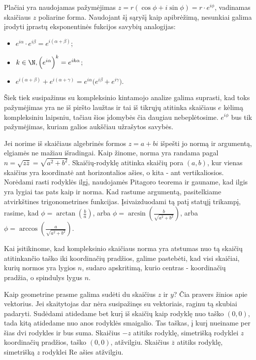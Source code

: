 Plačiai yra naudojamas pažymėjimas $z=r(\cos\phi+i\sin\phi)=r \cdot e^{i\phi}$, vadinamas skaičiaus $z$ poliarine forma. Naudojant šį sąryšį kaip apibrėžimą, nesunkiai galima įrodyti įprastų eksponentinės fukcijos savybių analogijas: \begin{itemize} 
\item $e^{i\alpha}\cdot e^{i\beta}=e^{i(\alpha+\beta)}$;
\item $k\in\N, \Big(e^{i\alpha}\Big)^k=e^{ik\alpha}$;
\item $e^{i(\alpha+\beta)}+e^{i(\alpha+\gamma)}=e^{i\alpha}\big(e^{i\beta}+e^{i\gamma}\big).$
\end{itemize}
Šiek tiek susipažinus su kompleksinio kintamojo analize galima suprasti, kad toks pažymėjimas yra ne iš piršto laužtas ir tai iš tikrųjų atitinka skaičiaus $e$ kėlimą kompleksiniu laipsniu, tačiau šios įdomybės čia daugiau nebeplėtosime. $e^{i\phi}$ bus tik pažymėjimas, kuriam galios aukščiau užrašytos savybės.

Jei norime iš skaičiaus algebrinės formos $z=a+bi$ išpešti jo normą ir argumentą, elgiamės ne mažiau išradingai. Kaip žinome, norma yra randama pagal $n=\sqrt{z\overline{z}}=\sqrt{a^2+b^2}$. Skaičių-rodyklę atitinka skaičių pora $(a,b)$, kur vienas skaičius yra koordinatė ant horizontalios ašies, o kita - ant vertikaliosios. Norėdami rasti rodyklės ilgį, naudojamės Pitagoro teorema ir gauname, kad ilgis yra lygiai tas pats kaip ir norma. Kad rastume argumentą, pasitelkiame atvirkštines trigonometrines funkcijas. Įsivaizduodami tą patį statųjį trikampį, rasime, kad $\phi=\arctan(\frac{b}{a})$, arba $\phi=\arcsin(\frac{b}{\sqrt{a^2+b^2}})$, arba $\phi=\arccos(\frac{a}{\sqrt{a^2+b^2}})$. 

Kai įsitikinome, kad kompleksinio skaičiaus norma yra atstumas nuo tą skaičių atitinkančio taško iki koordinačių pradžios, galime pastebėti, kad visi skaičiai, kurių normos yra lygios $n$, sudaro apskritimą, kurio centras - koordinačių pradžia, o spindulys lygus $n$. 
 
Kaip geometrine prasme galima sudėti du skaičius $z$ ir $y$? Čia pravers žinios apie vektorius. Jei skaitytojas dar nėra susipažinęs su vektoriais, raginu tą skubiai padaryti. Sudėdami atidedame bet kurį iš skaičių kaip rodyklę nuo taško $(0,0)$, tada kitą atidedame nuo anos rodyklės smaigalio. Tas taškas, į kurį nueiname per šias dvi rodykles ir bus suma. Skaičius $-z$ atitiks rodyklę, simetrišką rodyklei $z$ koordinačių pradžios, taško $(0,0)$, atžvilgiu. Skaičius $\overline{z}$ atitiks rodyklę, simetrišką $z$ rodyklei Re ašies atžvilgiu. 
 
